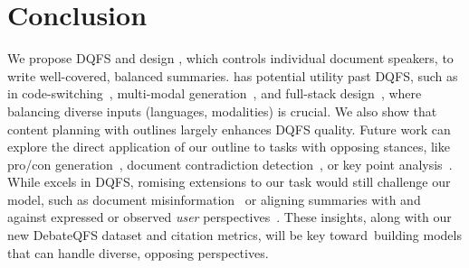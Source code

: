 \section{Conclusion}

We propose DQFS and design \model, which controls individual document speakers, to write well-covered, balanced summaries.
\model has potential utility past DQFS, such as in code-switching~\cite{gao2019code}, multi-modal generation~\cite{dai2022enabling}, and full-stack design~\cite{si2024design2code}, where balancing diverse inputs (languages, modalities) is crucial.
We also show that content planning with outlines largely enhances DQFS quality.
Future work can explore the direct application of our outline to tasks with opposing stances, like pro/con generation~\cite{kumar2023apcs}, document contradiction detection~\cite{deusser2023contradiction}, or key point analysis~\cite{kunneman2018aspect}.
While \model excels in DQFS, romising extensions to our task would still challenge our model, such as document misinformation~\cite{sung2023not} or aligning summaries with and against expressed or observed \textit{user} perspectives~\cite{balepur2024smart}.
These insights, along with our new DebateQFS dataset and citation metrics, will be key toward~building models that can handle diverse, opposing perspectives.



